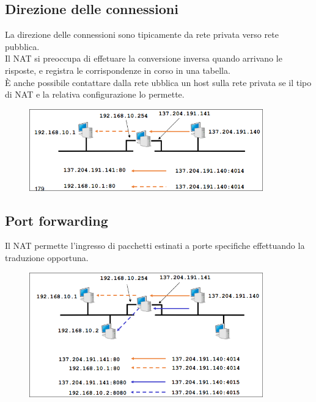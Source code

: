 \documentclass{report}
\begin{document}
            \subsection{Direzione delle connessioni}
                La direzione delle connessioni sono tipicamente da rete privata verso rete pubblica.
                \\
                Il NAT si preoccupa di effetuare la conversione inversa quando arrivano le risposte, e registra le corrispondenze in corso in una tabella.
                \\
                È anche possibile contattare dalla rete ubblica un host sulla rete privata se il tipo di NAT e la relativa configurazione lo permette.
               \begin{figure}[H]
                    \includegraphics[width=0.9\textwidth]{2/dirc.png}
                \end{figure}
            \subsection{Port forwarding}
                Il NAT permette l'ingresso di pacchetti estinati a porte specifiche effettuando la traduzione opportuna.
                 \begin{figure}[H]
                    \includegraphics[width=0.9\textwidth]{2/portFor.png}
                \end{figure}
\end{document}
